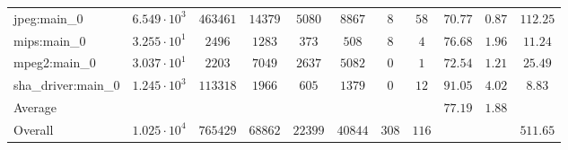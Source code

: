 \begin{tabular}{|l|c|c|c|c|c|c|c|c|c|c|}
jpeg:main\_0            & $ 6.549 \cdot 10^{3} $ & $ 463461 $ & $ 14379 $ & $ 5080  $ & $ 8867  $ & $ 8   $ & $ 58  $ & $ 70.77       $ & $ 0.87    $ & $ 112.25  $ \\
mips:main\_0            & $ 3.255 \cdot 10^{1} $ & $ 2496   $ & $ 1283  $ & $ 373   $ & $ 508   $ & $ 8   $ & $ 4   $ & $ 76.68       $ & $ 1.96    $ & $ 11.24   $ \\
mpeg2:main\_0           & $ 3.037 \cdot 10^{1} $ & $ 2203   $ & $ 7049  $ & $ 2637  $ & $ 5082  $ & $ 0   $ & $ 1   $ & $ 72.54       $ & $ 1.21    $ & $ 25.49   $ \\
sha\_driver:main\_0     & $ 1.245 \cdot 10^{3} $ & $ 113318 $ & $ 1966  $ & $ 605   $ & $ 1379  $ & $ 0   $ & $ 12  $ & $ 91.05       $ & $ 4.02    $ & $ 8.83    $ \\
\hline
Average                 & $                    $ & $        $ & $       $ & $       $ & $       $ & $     $ & $     $ & $ 77.19       $ & $ 1.88    $ & $         $ \\
\hline
Overall                 & $ 1.025 \cdot 10^{4} $ & $ 765429 $ & $ 68862 $ & $ 22399 $ & $ 40844 $ & $ 308 $ & $ 116 $ & $             $ & $         $ & $ 511.65  $ \\
\hline
\end{tabular}
